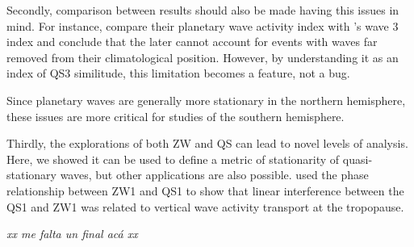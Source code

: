 \documentclass[draft,linenumbers]{agujournal2018}
\begin{document}
Secondly, comparison between results should also be made having this
issues in mind. For instance, \citet{Irving2015} compare their planetary
wave activity index with \citet{Raphael2004}'s wave 3 index and conclude
that the later cannot account for events with waves far removed from
their climatological position. However, by understanding it as an index
of QS3 similitude, this limitation becomes a feature, not a bug.

Since planetary waves are generally more stationary in the northern
hemisphere, these issues are more critical for studies of the southern
hemisphere.

Thirdly, the explorations of both ZW and QS can lead to novel levels of
analysis. Here, we showed it can be used to define a metric of
stationarity of quasi-stationary waves, but other applications are also
possible. \citet{Smith2012} used the phase relationship between ZW1 and
QS1 to show that linear interference between the QS1 and ZW1 was related
to vertical wave activity transport at the tropopause.

\emph{xx me falta un final acá xx}


\end{document}
